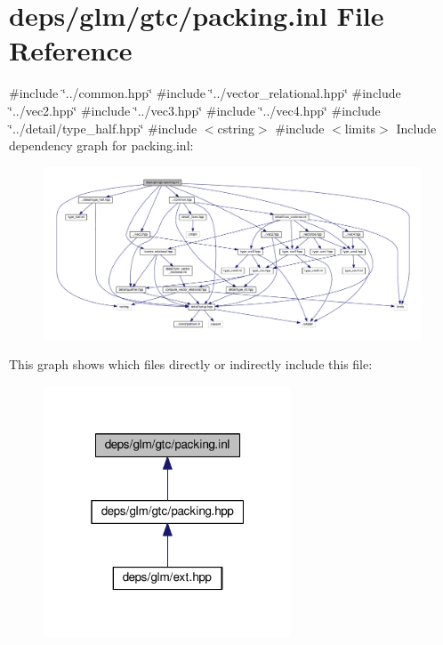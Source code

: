 \hypertarget{packing_8inl}{}\section{deps/glm/gtc/packing.inl File Reference}
\label{packing_8inl}
{\ttfamily \#include \char`\"{}../common.\+hpp\char`\"{}}\newline
{\ttfamily \#include \char`\"{}../vector\+\_\+relational.\+hpp\char`\"{}}\newline
{\ttfamily \#include \char`\"{}../vec2.\+hpp\char`\"{}}\newline
{\ttfamily \#include \char`\"{}../vec3.\+hpp\char`\"{}}\newline
{\ttfamily \#include \char`\"{}../vec4.\+hpp\char`\"{}}\newline
{\ttfamily \#include \char`\"{}../detail/type\+\_\+half.\+hpp\char`\"{}}\newline
{\ttfamily \#include $<$cstring$>$}\newline
{\ttfamily \#include $<$limits$>$}\newline
Include dependency graph for packing.\+inl\+:
\nopagebreak
\begin{figure}[H]
\begin{center}
\leavevmode
\includegraphics[width=350pt]{d5/d45/packing_8inl__incl}
\end{center}
\end{figure}
This graph shows which files directly or indirectly include this file\+:
\nopagebreak
\begin{figure}[H]
\begin{center}
\leavevmode
\includegraphics[width=208pt]{df/d95/packing_8inl__dep__incl}
\end{center}
\end{figure}
